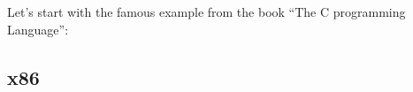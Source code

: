 \section{\HelloWorldSectionName}
\label{sec:helloworld}

{Let's start with the famous example from the book}
``The C programming Language''\cite{Kernighan:1988:CPL:576122}:



\subsection{x86}







